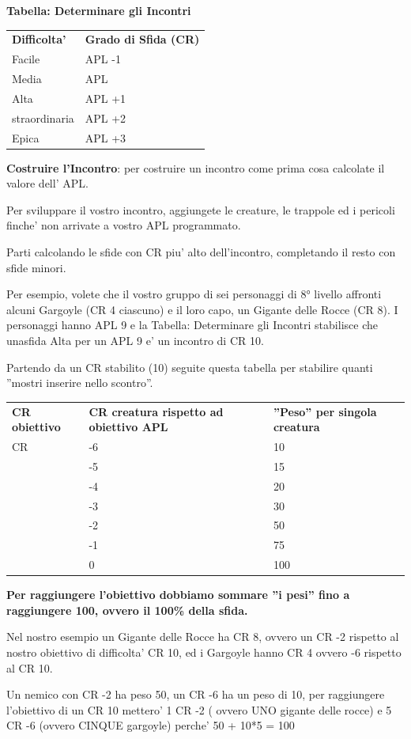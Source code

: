 \documentclass[a4paper,11pt,twoside,openany]{book}
\begin{document}
{		\bigskip
		
		\textbf{Tabella: Determinare gli Incontri}
		
		\begin{tabular}{ll}
			\toprule
			\textbf{Difficolta'} & \textbf{Grado di Sfida (CR)}\tabularnewline
			Facile & APL -1\tabularnewline
			Media & APL\tabularnewline
			Alta & APL +1\tabularnewline
			straordinaria & APL +2\tabularnewline
			Epica & APL +3\tabularnewline
		\end{tabular}
		
		\bigskip
		
		\textbf{Costruire l'Incontro}: per costruire un incontro come prima cosa calcolate il valore dell' APL.
		
		Per sviluppare il vostro incontro, aggiungete le creature, le trappole ed i pericoli finche' non arrivate a vostro APL programmato.
		
		Parti calcolando le sfide con CR piu' alto dell'incontro, completando il resto con sfide minori.
		
		Per esempio, volete che il vostro gruppo di sei personaggi di 8° livello affronti alcuni Gargoyle (CR 4 ciascuno) e il loro capo, un Gigante delle Rocce (CR 8). I personaggi hanno APL 9 e la Tabella: Determinare gli Incontri stabilisce che unasfida Alta per un APL 9 e' un incontro di CR 10.
		
		Partendo da un CR stabilito (10) seguite questa tabella per stabilire quanti ''mostri inserire nello scontro''.
		
		\bigskip
		
		\begin{tabular}{lll}
			\toprule
			\textbf{CR obiettivo} & \textbf{CR creatura rispetto ad obiettivo APL} & \textbf{''Peso'' per singola creatura}\tabularnewline
			CR & -6 & 10\tabularnewline
			& -5 & 15\tabularnewline
			& -4 & 20\tabularnewline
			& -3 & 30\tabularnewline
			& -2 & 50\tabularnewline
			& -1 & 75\tabularnewline
			& 0 & 100\tabularnewline
		\end{tabular}
		
		\bigskip
		
		\textbf{Per raggiungere l'obiettivo dobbiamo sommare ''i pesi''
			fino a raggiungere 100, ovvero il 100\% della sfida.}
		
		Nel nostro esempio un Gigante delle Rocce ha CR 8, ovvero un CR -2 rispetto al nostro obiettivo di difficolta' CR 10, ed i Gargoyle hanno CR 4 ovvero -6 rispetto al CR 10.
		
		Un nemico con CR -2 ha peso 50, un CR -6 ha un peso di 10, per raggiungere l'obiettivo di un CR 10 mettero' 1 CR -2 ( ovvero UNO gigante delle rocce) e 5 CR -6 (ovvero CINQUE gargoyle) perche' 50 + 10{*}5 = 100
		
}
\end{document}
